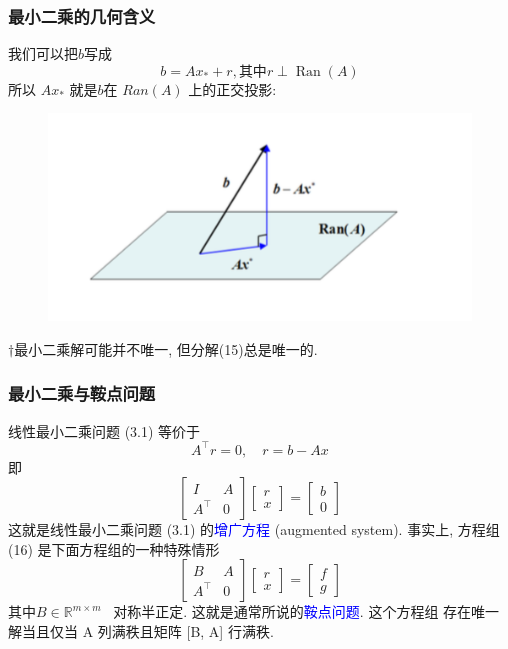 \documentclass[notheorems,serif]{beamer}
\begin{document}
\begin{frame}
\frametitle{最小二乘的几何含义}
我们可以把$b$写成
\begin{equation}
b=A x_{*}+r, \text  {其中} r \perp \operatorname{Ran}(A)
\end{equation}
所以 $Ax_{*}$ 就是$b$在 $Ran(A)$ 上的正交投影:
\begin{figure}[htbp]
	\begin{center}
        \includegraphics[scale=1]{figures/3-2.png}
		\label{default}
	\end{center}
\end{figure}

$\dagger$最小二乘解可能并不唯一, 但分解(15)总是唯一的.
\end{frame}

\begin{frame}
\frametitle{最小二乘与鞍点问题}
线性最小二乘问题 (3.1) 等价于
$$
A^{\top} r=0, \quad r=b-A x
$$
即
\begin{equation}
\left[\begin{array}{cc}{I} & {A} \\ {A^{\top}} & {0}\end{array}\right]\left[\begin{array}{l}{r} \\ {x}\end{array}\right]=\left[\begin{array}{l}{b} \\ {0}\end{array}\right]
\end{equation}
这就是线性最小二乘问题 (3.1) 的\textcolor{blue}{增广方程} (augmented system). 事实上,
方程组 (16) 是下面方程组的一种特殊情形
$$
\left[\begin{array}{cc}{B} & {A} \\ {A^{\top}} & {0}\end{array}\right]\left[\begin{array}{l}{r} \\ {x}\end{array}\right]=\left[\begin{array}{l}{f} \\ {g}\end{array}\right]
$$
其中$B \in \mathbb{R}^{m \times m}$ ~对称半正定. 这就是通常所说的\textcolor{blue}{鞍点问题}. 这个方程组 存在唯一解当且仅当 A 列满秩且矩阵 [B, A] 行满秩.
\end{frame}
\end{document}
